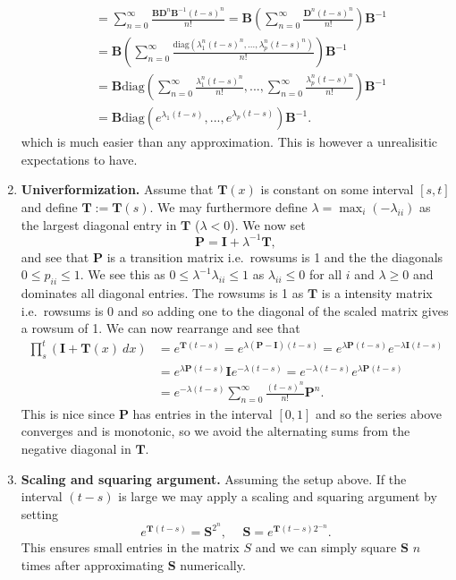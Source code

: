 \documentclass[a4paper,12pt,openany]{book}
\begin{document}
\begin{enumerate}
\begin{align*}
    &=\sum_{n=0}^\infty \frac{\mathbf{B}\mathbf{D}^n\mathbf{B}^{-1}(t-s)^n}{n!}=\mathbf{B}\left(\sum_{n=0}^\infty \frac{\mathbf{D}^n(t-s)^n}{n!}\right)\mathbf{B}^{-1}\\
    &=\mathbf{B}\left(\sum_{n=0}^\infty \frac{\text{diag}(\lambda_1^n(t-s)^n,...,\lambda_p^n(t-s)^n)}{n!}\right)\mathbf{B}^{-1}\\
    &=\mathbf{B}\text{diag}\left(\sum_{n=0}^\infty \frac{\lambda_1^n(t-s)^n}{n!},...,\sum_{n=0}^\infty \frac{\lambda_p^n(t-s)^n}{n!}\right)\mathbf{B}^{-1}\\
    &=\mathbf{B}\text{diag}\left(e^{\lambda_1(t-s)},...,e^{\lambda_p(t-s)}\right)\mathbf{B}^{-1}.
    \end{align*}
  which is much easier than any approximation. This is however a unrealisitic expectations to have.
\item
  \textbf{Univerformization.} Assume that \(\mathbf{T}(x)\) is constant on some interval \([s,t]\) and define \(\mathbf{T}:=\mathbf{T}(s)\). We may furthermore define \(\lambda= \max_{i}(-\lambda_{ii})\) as the largest diagonal entry in \(\mathbf T\) (\(\lambda <0\)). We now set
  \[
    \mathbf P = \mathbf I + \lambda^{-1}\mathbf T,
    \]
  and see that \(\mathbf P\) is a transition matrix i.e.~rowsums is 1 and the the diagonals \(0\le p_{ii}\le 1\). We see this as \(0\le \lambda^{-1}\lambda_{ii}\le1\) as \(\lambda_{ii}\le 0\) for all \(i\) and \(\lambda\ge 0\) and dominates all diagonal entries. The rowsums is 1 as \(\mathbf T\) is a intensity matrix i.e.~rowsums is 0 and so adding one to the diagonal of the scaled matrix gives a rowsum of 1. We can now rearrange and see that
  \begin{align*}
    \prod_s^t(\mathbf I + \mathbf T(x)\ dx)&=e^{\mathbf{T}(t-s)}=e^{\lambda (\mathbf P - \mathbf I)(t-s)}=e^{\lambda \mathbf P (t-s)}e^{-\lambda \mathbf I(t-s)}\\
    &=e^{\lambda \mathbf P (t-s)}\mathbf Ie^{-\lambda (t-s)}=e^{-\lambda (t-s)}e^{\lambda \mathbf P (t-s)}\\
    &=e^{-\lambda (t-s)}\sum_{n=0}^\infty \frac{(t-s)^n}{n!}\mathbf{P}^n.
    \end{align*}
  This is nice since \(\mathbf P\) has entries in the interval \([0,1]\) and so the series above converges and is monotonic, so we avoid the alternating sums from the negative diagonal in \(\mathbf T\).
\item
  \textbf{Scaling and squaring argument.} Assuming the setup above. If the interval \((t-s)\) is large we may apply a scaling and squaring argument by setting
  \[
    e^{\mathbf T(t-s)}=\mathbf{S}^{2^n},\hspace{15pt}\mathbf{S}=e^{\mathbf T (t-s)2^{-n}}.
    \]
  This ensures small entries in the matrix \(S\) and we can simply square \(\mathbf S\) \(n\) times after approximating \(\mathbf S\) numerically.
\end{enumerate}
\end{document}

